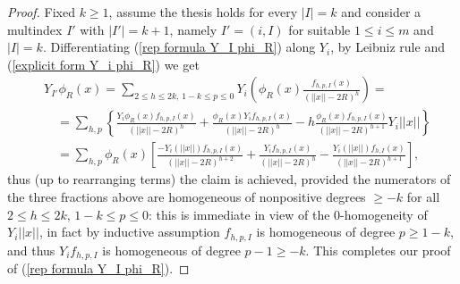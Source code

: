 \documentclass{article}
\numberwithin{equation}{section}
\begin{document}
\begin{proof}
Fixed $k \geq 1$, assume the thesis holds for every $|I|=k$ and consider a multindex $I'$ with $|I'|=k+1$, namely $I'=(i,I)$ for suitable $1 \leq i \leq m$ and $|I|=k$. Differentiating (\ref{rep formula Y_I phi_R}) along $Y_i$, by Leibniz rule and (\ref{explicit form Y_i phi_R}) we get
\begin{align*}
    & Y_{I'} \phi_R(x)= \sum_{2 \leq h \leq 2k, \, 1-k \leq p \leq 0} Y_i \left( \phi_R(x) \frac{f_{h,p,I}(x)}{(||x||-2R)^h} \right) = \\
    & \quad = \sum_{h,p} \left\{\frac{Y_i \phi_R(x) f_{h,p,I}(x)}{(||x||-2R)^h}+\frac{\phi_R(x) Y_i f_{h,p,I}(x)}{(||x||-2R)^h}-h\frac{\phi_R(x) f_{h,p,I}(x)}{(||x||-2R)^{h+1}} Y_i ||x|| \right\} \\
    & \quad = \sum_{h,p} \phi_R(x) \left[\frac{-Y_i (||x||)f_{h,p,I}(x)}{(||x||-2R)^{h+2}} + \frac{Y_i f_{h,p,I}(x)}{(||x||-2R)^h} - \frac{Y_i(||x||) f_{h,I}(x)}{(||x||-2R)^{h+1}} \right],
\end{align*}
thus (up to rearranging terms) the claim is achieved, provided the numerators of the three fractions above are homogeneous of nonpositive degrees $ \geq -k$ for all $2 \leq h \leq 2k, \, 1-k \leq p \leq 0$: this is immediate in view of the $0$-homogeneity of $Y_i ||x||$, in fact by inductive assumption $f_{h,p,I}$ is homogeneous of degree $p \geq 1-k$, and thus $Y_i f_{h,p,I}$ is homogeneous of degree $p-1 \geq -k$. This completes our proof of (\ref{rep formula Y_I phi_R}).

\end{proof}
\end{document}
